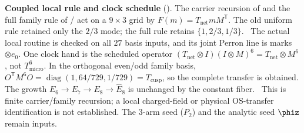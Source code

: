 \par\smallskip\noindent\textbf{Coupled local rule and clock schedule}
(). The carrier recursion of
 and the full family rule of
/
act on a $9\times3$ grid by $F(m)=T_{\mathrm{net}}mM^{\mathsf T}$.
The old uniform  rule retained only the
$2/3$ mode; the full rule retains $\{1,2/3,1/3\}$.
\mE\ The actual local routine is checked on all $27$ basis inputs, and its
joint Perron line is marks$\otimes e_0$. One clock hand is the scheduled
operator $(T_{\mathrm{net}}\otimes I)(I\otimes M)^6=T_{\mathrm{net}}\otimes M^6$,
not $T_{\mathrm{micro}}^6$. In the orthogonal even/odd family basis,
$O^{\mathsf T}M^6O=\operatorname{diag}(1,64/729,1/729)=T_{\mathrm{cusp}}$,
so the complete  transfer is obtained.
The growth $E_6\to E_7\to E_8\to\hat E_8$ is unchanged by the constant fiber.
\mO\ This is finite carrier/family recursion; a local charged-field or
physical OS-transfer identification is not established. The $3$-arm seed
($P_2$) and the analytic seed $\phiz$ remain inputs.

